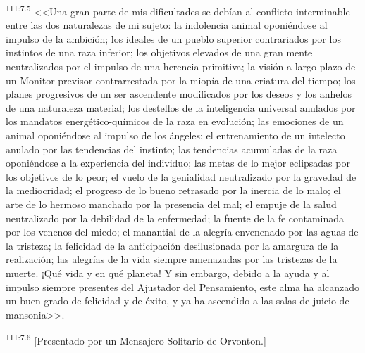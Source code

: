 \par
\textsuperscript{111:7.5} <<Una gran parte de mis dificultades se debían al conflicto interminable entre las dos naturalezas de mi sujeto: la indolencia animal oponiéndose al impulso de la ambición; los ideales de un pueblo superior contrariados por los instintos de una raza inferior; los objetivos elevados de una gran mente neutralizados por el impulso de una herencia primitiva; la visión a largo plazo de un Monitor previsor contrarrestada por la miopía de una criatura del tiempo; los planes progresivos de un ser ascendente modificados por los deseos y los anhelos de una naturaleza material; los destellos de la inteligencia universal anulados por los mandatos energético-químicos de la raza en evolución; las emociones de un animal oponiéndose al impulso de los ángeles; el entrenamiento de un intelecto anulado por las tendencias del instinto; las tendencias acumuladas de la raza oponiéndose a la experiencia del individuo; las metas de lo mejor eclipsadas por los objetivos de lo peor; el vuelo de la genialidad neutralizado por la gravedad de la mediocridad; el progreso de lo bueno retrasado por la inercia de lo malo; el arte de lo hermoso manchado por la presencia del mal; el empuje de la salud neutralizado por la debilidad de la enfermedad; la fuente de la fe contaminada por los venenos del miedo; el manantial de la alegría envenenado por las aguas de la tristeza; la felicidad de la anticipación desilusionada por la amargura de la realización; las alegrías de la vida siempre amenazadas por las tristezas de la muerte. ¡Qué vida y en qué planeta! Y sin embargo, debido a la ayuda y al impulso siempre presentes del Ajustador del Pensamiento, este alma ha alcanzado un buen grado de felicidad y de éxito, y ya ha ascendido a las salas de juicio de mansonia>>.

\par
\textsuperscript{111:7.6} [Presentado por un Mensajero Solitario de Orvonton.]